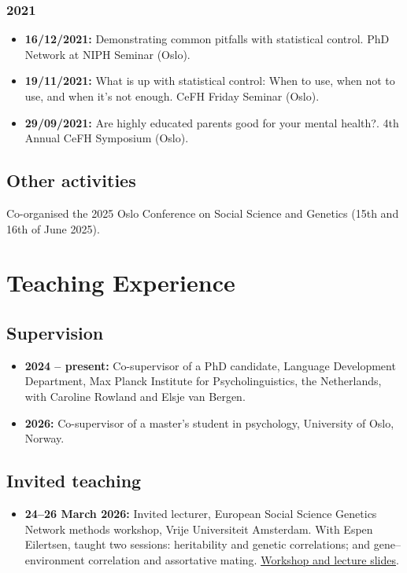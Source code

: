 \documentclass[10pt,a4paper]{article}
\let\cvhref\href
\renewcommand{\href}[2]{\cvhref{#1}{\underline{#2}}}%
\begin{document}
\subsubsection*{2021}
\begin{itemize}
\item \textbf{16/12/2021:} Demonstrating common pitfalls with statistical control. PhD Network at NIPH Seminar (Oslo).
\item \textbf{19/11/2021:} What is up with statistical control: When to use, when not to use, and when it's not enough. CeFH Friday Seminar (Oslo).
\item \textbf{29/09/2021:} Are highly educated parents good for your mental health?. 4th Annual CeFH Symposium (Oslo).
\end{itemize}

\subsection*{Other activities}
Co-organised the 2025 Oslo Conference on Social Science and Genetics (15th and 16th of June 2025).

\section*{Teaching Experience}
\subsection*{Supervision}
\begin{itemize}
\item \textbf{2024 -- present:} Co-supervisor of a PhD candidate, Language Development Department, Max Planck Institute for Psycholinguistics, the Netherlands, with Caroline Rowland and Elsje van Bergen.
\item \textbf{2026:} Co-supervisor of a master's student in psychology, University of Oslo, Norway.
\end{itemize}

\subsection*{Invited teaching}
\begin{itemize}
\item \textbf{24--26 March 2026:} Invited lecturer, European Social Science Genetics Network methods workshop, Vrije Universiteit Amsterdam. With Espen Eilertsen, taught two sessions: heritability and genetic correlations; and gene--environment correlation and assortative mating. \href{https://essgn.org/amsterdam-workshop-2026/}{Workshop and lecture slides}.
\end{itemize}
\end{document}

